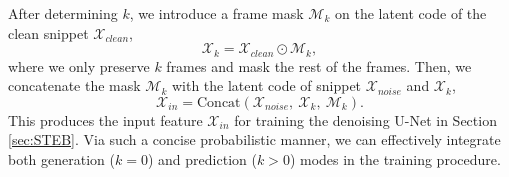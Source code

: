After determining $k$,
we introduce a frame mask $\mathcal{M}_{k}$ on the latent code of the clean snippet $\mathcal{X}_{clean}$,
\begin{equation}
\mathcal{X}_{k}=\mathcal{X}_{clean}\odot\mathcal{M}_{k}, \label{eq:ms1}
\end{equation}
where
we only preserve $k$ frames and mask the rest of the frames.
Then,
we concatenate the mask $\mathcal{M}_{k}$ with the latent code of snippet $\mathcal{X}_{noise}$ and $\mathcal{X}_{k}$,
\begin{equation}
\mathcal{X}_{in}=\text{Concat}(\mathcal{X}_{noise},~\mathcal{X}_{k},~\mathcal{M}_{k}).\label{eq:ms3}  
\end{equation}
This produces the input feature $\mathcal{X}_{in}$ for training the denoising U-Net in Section \ref{sec:STEB}.
Via such a concise probabilistic manner,
we can effectively integrate both generation ($k$$=$$0$) and prediction ($k$$>$$0$) modes in the training procedure.







